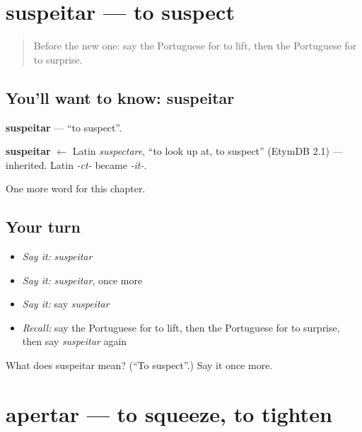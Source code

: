 \section[suspeitar]{suspeitar — to suspect}

\label{lesson:PT-C238-suspeitar}



\begin{quote}
Before the new one: say the Portuguese for to lift, then the Portuguese for to surprise.
\end{quote}

\subsection*{You'll want to know: suspeitar}
\textbf{suspeitar} — \textquotedblleft{}to suspect\textquotedblright{}.

\begin{cousinweb}
\textbf{suspeitar} $\leftarrow$ Latin \emph{suspectare}, \textquotedblleft{}to look up at, to suspect\textquotedblright{} (EtymDB 2.1) — inherited. Latin \emph{-ct-} became \emph{-it-}.
\end{cousinweb}

\begin{grammarlens}[title={What you've built}]
One more word for this chapter.
\end{grammarlens}

\subsection*{Your turn}
\begin{itemize}
\raggedright
  \item \emph{Say it:} \emph{suspeitar}
  \item \emph{Say it:} \emph{suspeitar}, once more
  \item \emph{Say it:} say \emph{suspeitar}
  \item \emph{Recall:} say the Portuguese for to lift, then the Portuguese for to surprise, then say \emph{suspeitar} again
\end{itemize}

\begin{tcolorbox}[breakable,colback=teal!4,colframe=teal!35!black,title={Before you move on}]
What does suspeitar mean? (\textquotedblleft{}To suspect\textquotedblright{}.) Say it once more.
\end{tcolorbox}
\section[apertar]{apertar — to squeeze, to tighten}

